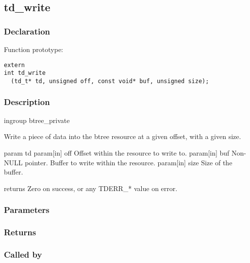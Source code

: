 
\newpage
\subsection{td\_write}
\subsubsection{Declaration} Function prototype:

\begin{verbatim}
extern
int td_write
  (td_t* td, unsigned off, const void* buf, unsigned size);
\end{verbatim}

\subsubsection{Description}


 ingroup btree\_private

 Write a piece of data into the btree resource at a given offset,
 with a given size.

 param td
 param[in] off Offset within the resource to write to.
 param[in] buf Non-NULL pointer. Buffer to write within the resource.
 param[in] size Size of the buffer.

 returns Zero on success, or any TDERR\_* value on error.
 

\subsubsection{Parameters}
\subsubsection{Returns}
\subsubsection{Called by}
